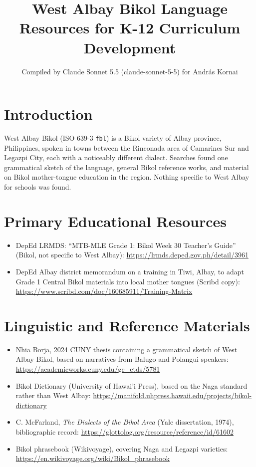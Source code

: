 \documentclass[12pt]{article}
\title{West Albay Bikol Language Resources for K-12 Curriculum Development}
\author{Compiled by Claude Sonnet 5.5 (claude-sonnet-5-5) for Andr\'as Kornai}
\date{}
\begin{document}
\maketitle

\section{Introduction}
West Albay Bikol (ISO 639-3 \texttt{fbl}) is a Bikol variety of Albay province, Philippines, spoken in towns between the Rinconada area of Camarines Sur and Legazpi City, each with a noticeably different dialect. Searches found one grammatical sketch of the language, general Bikol reference works, and material on Bikol mother-tongue education in the region. Nothing specific to West Albay for schools was found.

\section{Primary Educational Resources}
\begin{itemize}
\item DepEd LRMDS: ``MTB-MLE Grade 1: Bikol Week 30 Teacher's Guide'' (Bikol, not specific to West Albay): \url{https://lrmds.deped.gov.ph/detail/3961}
\item DepEd Albay district memorandum on a training in Tiwi, Albay, to adapt Grade 1 Central Bikol materials into local mother tongues (Scribd copy): \url{https://www.scribd.com/doc/160685911/Training-Matrix}
\end{itemize}

\section{Linguistic and Reference Materials}
\begin{itemize}
\item Nhia Borja, 2024 CUNY thesis containing a grammatical sketch of West Albay Bikol, based on narratives from Balugo and Polangui speakers: \url{https://academicworks.cuny.edu/gc_etds/5781}
\item Bikol Dictionary (University of Hawai'i Press), based on the Naga standard rather than West Albay: \url{https://manifold.uhpress.hawaii.edu/projects/bikol-dictionary}
\item C. McFarland, \emph{The Dialects of the Bikol Area} (Yale dissertation, 1974), bibliographic record: \url{https://glottolog.org/resource/reference/id/61602}
\item Bikol phrasebook (Wikivoyage), covering Naga and Legazpi varieties: \url{https://en.wikivoyage.org/wiki/Bikol_phrasebook}
\end{itemize}
\end{document}
